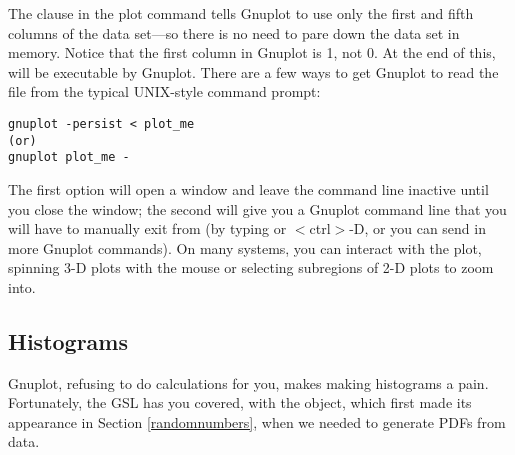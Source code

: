 The clause  in the plot command tells Gnuplot to use
only the first and fifth columns of the data set---so there is no need to pare
down the data set in memory. Notice that the first column in Gnuplot is
1, not 0. At the end of this,  will be executable by
Gnuplot. There are a few ways to get Gnuplot to read the file from the
typical UNIX-style command prompt:
\begin{lstlisting}
gnuplot -persist < plot_me
(or)
gnuplot plot_me -
\end{lstlisting}
The first option will open a window and leave the command line inactive
until you close the window;
the second will give you a Gnuplot command line that you will have to
manually exit
from (by typing  or $<$ctrl$>$-D, or you can send in more
Gnuplot commands). On many systems, you can
interact with the plot, spinning 3-D plots with the mouse or selecting
subregions of 2-D plots to zoom into.

\subsection{Histograms} Gnuplot, refusing to do calculations for you,
makes making histograms a pain.  Fortunately, the GSL has you covered,
with the  object, which first made its appearance
in Section \ref{randomnumbers}, when we needed to generate PDFs from data.

